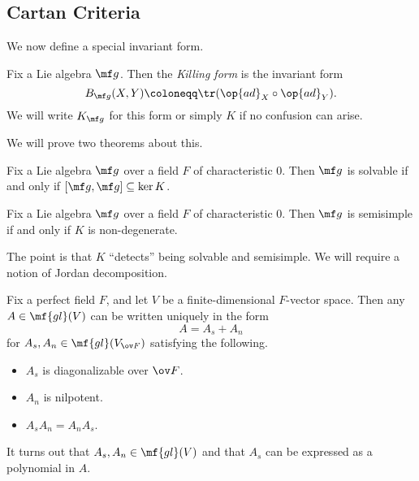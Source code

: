 \documentclass[../notes.tex]{subfiles}
\begin{document}
\subsection{Cartan Criteria}
We now define a special invariant form.
\begin{definition}
	Fix a Lie algebra $\mf g$. Then the \textit{Killing form} is the invariant form
	\[B_{\mf g}(X,Y)\coloneqq\tr({\op{ad}_X}\circ{\op{ad}_Y}).\]
	We will write $K_{\mf g}$ for this form or simply $K$ if no confusion can arise.
\end{definition}
We will prove two theorems about this.
\begin{theorem}
	Fix a Lie algebra $\mf g$ over a field $F$ of characteristic $0$. Then $\mf g$ is solvable if and only if $[\mf g,\mf g]\subseteq\ker K$.
\end{theorem}
\begin{theorem}
	Fix a Lie algebra $\mf g$ over a field $F$ of characteristic $0$. Then $\mf g$ is semisimple if and only if $K$ is non-degenerate.
\end{theorem}
The point is that $K$ ``detects'' being solvable and semisimple. We will require a notion of Jordan decomposition.
\begin{proposition}
	Fix a perfect field $F$, and let $V$ be a finite-dimensional $F$-vector space. Then any $A\in\mf{gl}(V)$ can be written uniquely in the form
	\[A=A_s+A_n\]
	for $A_s,A_n\in\mf{gl}(V_{\ov F})$ satisfying the following.
	\begin{itemize}
		\item $A_s$ is diagonalizable over $\ov F$.
		\item $A_n$ is nilpotent.
		\item $A_sA_n=A_nA_s$.
	\end{itemize}
	It turns out that $A_s,A_n\in\mf{gl}(V)$ and that $A_s$ can be expressed as a polynomial in $A$.
\end{proposition}
\end{document}
